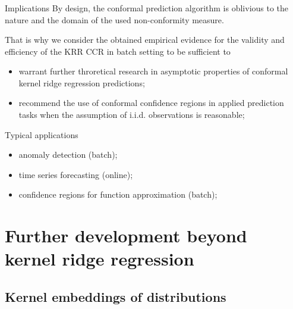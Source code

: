 \documentclass[t]{beamer}  %
\begin{document}
\begin{frame}[c]\frametitle{\insertsection}
  \begin{block}{Implications}
    By design, the conformal prediction algorithm is oblivious to the nature and
    the domain of the used non-conformity measure.

    That is why we consider the obtained empirical evidence for the validity and
    efficiency of the KRR CCR in batch setting to be sufficient to \begin{itemize}
      \item warrant further throretical research in asymptotic properties of conformal
      kernel ridge regression predictions;
      \item recommend the use of conformal confidence regions in applied prediction
      tasks when the assumption of i.i.d. observations is reasonable;
    \end{itemize}
  \end{block}

  \begin{block}{Typical applications}
    \begin{itemize}
      \item anomaly detection (batch);
      \item time series forecasting (online);
      \item confidence regions for function approximation (batch);
    \end{itemize}
  \end{block}

\end{frame}


\section{Further development beyond kernel ridge regression} %
\label{sec:further_development_beyond_krr}

\subsection{Kernel embeddings of distributions} %
\label{sub:kernel_embeddings_of_distributions}
\end{document}
